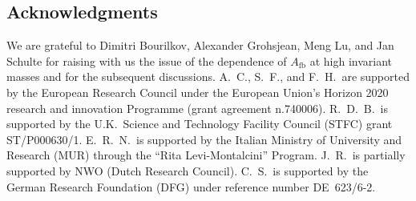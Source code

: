\subsection*{Acknowledgments}

We are grateful to Dimitri Bourilkov, Alexander Grohsjean, Meng Lu, and Jan Schulte for raising with us the issue of the
\pdf dependence of $A_{\text{fb}}$ at high invariant masses and for the subsequent discussions.
%
A.~C., S.~F., and F.~H.\ are supported by
the European Research Council under 
the European Union's Horizon 2020 research and innovation Programme
(grant agreement n.740006).
%
R.~D.~B.\ is supported by the U.K.\
Science and Technology Facility Council (STFC) grant ST/P000630/1.
%
E.~R.~N.\ is supported by the Italian Ministry of University and Research (MUR)
through the ``Rita Levi-Montalcini'' Program.
%
J.~R.\ is partially supported by NWO (Dutch Research Council).
%
C.~S.\ is supported by the German Research Foundation (DFG) under
reference number DE~623/6-2.
